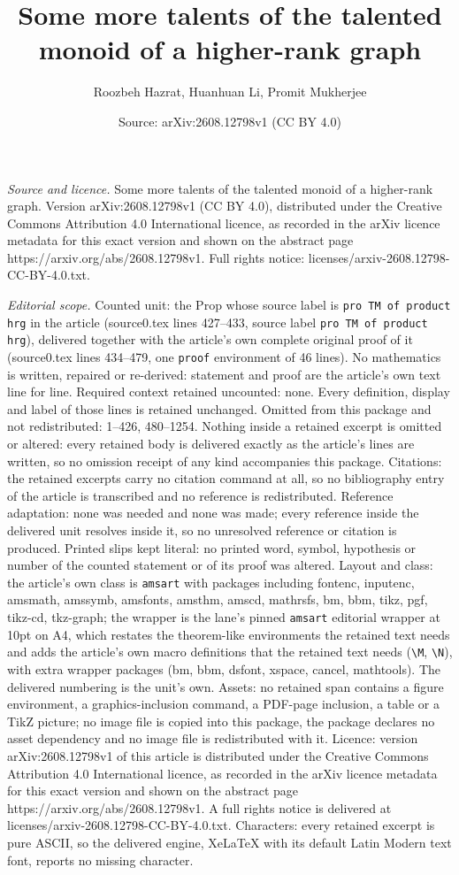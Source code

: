 \documentclass[10pt,a4paper]{amsart}
\title[Some more talents of the talented monoid of a higher-rank gr]{Some more talents of the talented monoid of a higher-rank graph}
\author{Roozbeh Hazrat, Huanhuan Li, Promit Mukherjee}
\date{Source: arXiv:2608.12798v1 (CC BY 4.0)}
\begin{document}
\maketitle

\noindent\emph{Source and licence.} Some more talents of the talented monoid of a higher-rank graph. Version arXiv:2608.12798v1 (CC BY 4.0), distributed under the Creative Commons Attribution 4.0 International licence, as recorded in the arXiv licence metadata for this exact version and shown on the abstract page https://arxiv.org/abs/2608.12798v1. Full rights notice: licenses/arxiv-2608.12798-CC-BY-4.0.txt.\par\smallskip

\noindent\textit{Editorial scope.} Counted unit: the Prop whose source label is \texttt{pro TM of product hrg} in the article (source0.tex lines 427--433, source label \texttt{pro TM of product hrg}), delivered together with the article's own complete original proof of it (source0.tex lines 434--479, one \texttt{proof} environment of 46 lines). No mathematics is written, repaired or re-derived: statement and proof are the article's own text line for line. Required context retained uncounted: none. Every definition, display and label of those lines is retained unchanged. Omitted from this package and not redistributed: 1--426, 480--1254. Nothing inside a retained excerpt is omitted or altered: every retained body is delivered exactly as the article's lines are written, so no omission receipt of any kind accompanies this package. Citations: the retained excerpts carry no citation command at all, so no bibliography entry of the article is transcribed and no reference is redistributed. Reference adaptation: none was needed and none was made; every reference inside the delivered unit resolves inside it, so no unresolved reference or citation is produced. Printed slips kept literal: no printed word, symbol, hypothesis or number of the counted statement or of its proof was altered. Layout and class: the article's own class is \texttt{amsart} with packages including fontenc, inputenc, amsmath, amssymb, amsfonts, amsthm, amscd, mathrsfs, bm, bbm, tikz, pgf, tikz-cd, tkz-graph; the wrapper is the lane's pinned \texttt{amsart} editorial wrapper at 10pt on A4, which restates the theorem-like environments the retained text needs and adds the article's own macro definitions that the retained text needs (\texttt{\textbackslash M}, \texttt{\textbackslash N}), with extra wrapper packages (bm, bbm, dsfont, xspace, cancel, mathtools). The delivered numbering is the unit's own. Assets: no retained span contains a figure environment, a graphics-inclusion command, a PDF-page inclusion, a table or a TikZ picture; no image file is copied into this package, the package declares no asset dependency and no image file is redistributed with it. Licence: version arXiv:2608.12798v1 of this article is distributed under the Creative Commons Attribution 4.0 International licence, as recorded in the arXiv licence metadata for this exact version and shown on the abstract page https://arxiv.org/abs/2608.12798v1. A full rights notice is delivered at licenses/arxiv-2608.12798-CC-BY-4.0.txt. Characters: every retained excerpt is pure ASCII, so the delivered engine, XeLaTeX with its default Latin Modern text font, reports no missing character.
\end{document}
